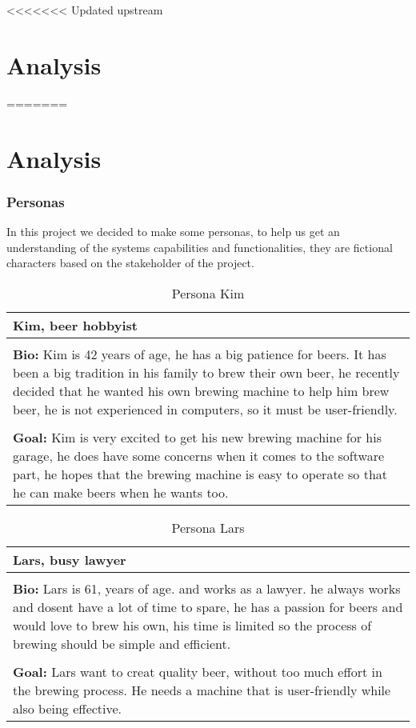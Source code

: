 <<<<<<< Updated upstream
\section{Analysis}
=======
\section{Analysis}
\subsubsection{Personas}
In this project we decided to make some personas, to help us get an understanding of the systems capabilities and functionalities, they are fictional characters based on the stakeholder of the project. \newline

\begin{table}[htb]
    \begin{center}
        \begin{tabular}{|p{16cm}|}
        \hline
        \textbf{Kim, beer hobbyist} \\
        \hline
        \\ \textbf{Bio:} Kim is 42 years of age, he has a big patience for beers. It has been a big tradition in his family to brew their own beer, he recently decided that he wanted his own brewing machine to help him brew beer, he is not experienced in computers, so it must be user-friendly.  \\
        \\
        \textbf{Goal:} Kim is very excited to get his new brewing machine for his garage, he does have some concerns when it comes to the software part, he hopes that the brewing machine is easy to operate so that he can make beers when he wants too. \\
        \hline
        \end{tabular}
        \caption{Persona Kim}
        \label{tab:persona_kim}
    \end{center}
\end{table}

\begin{table}[htb]
    \begin{center}
        \begin{tabular}{|p{16cm}|}
        \hline
        \textbf{Lars, busy lawyer} \\
        \hline
        \\ \textbf{Bio:} Lars is 61, years of age. and works as a lawyer. he always works and dosent have a lot of time to spare, he has a passion for beers and would love to brew his own, his time is limited so the process of brewing should be simple and efficient.  \\
        \\
        \textbf{Goal:} Lars want to creat quality beer, without too much effort in the brewing process. He needs a machine that is user-friendly while also being effective. \\
        \hline
        \end{tabular}
        \caption{Persona Lars}
        \label{tab:persona_lars}
    \end{center}
\end{table}

